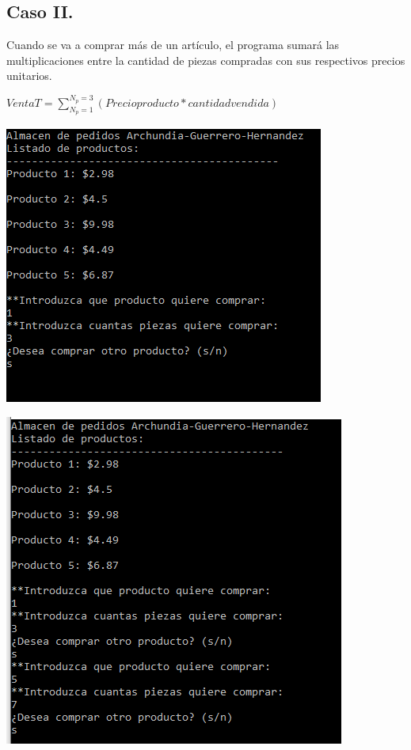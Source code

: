 \documentclass{article}
\begin{document}
\newpage

\subsection*{Caso II.}
Cuando se va a comprar más de un artículo, el programa sumará las multiplicaciones entre la cantidad de piezas compradas con sus respectivos precios unitarios.

\begin{center}
	\begin{large}
		$VentaT = \sum\limits_{N_p=1}^{N_p=3} (Precioproducto*cantidadvendida)$
	\end{large}
\end{center}


\begin{center} 
	\includegraphics[scale=0.5]{Images/Paso1(2).PNG}
	\label{figura3f}
\end{center}

\begin{center} 
	\includegraphics[scale=0.5]{Images/Paso2(2).PNG}
	\label{figura3g}
\end{center}
\end{document}
